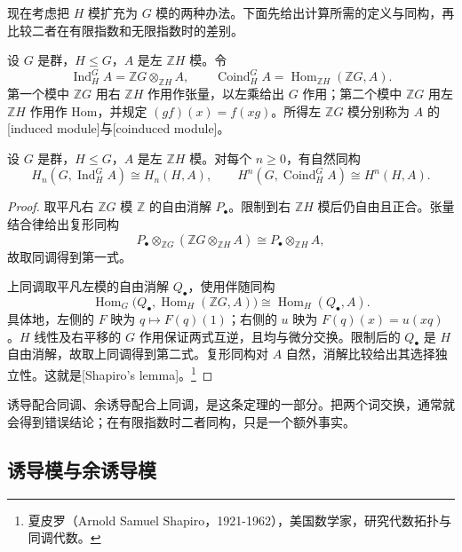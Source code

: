 \ProseParagraphBreak
现在考虑把 \(H\) 模扩充为 \(G\) 模的两种办法。下面先给出计算所需的定义与同构，再比较二者在有限指数和无限指数时的差别。

\begin{definition}\label{b4:def:group-induction}
设 \(G\) 是群，\(H\le G\)，\(A\) 是左 \(\mathbb ZH\) 模。令
\[
\operatorname{Ind}_H^G A=\mathbb ZG\otimes_{\mathbb ZH}A,\qquad
\operatorname{Coind}_H^G A=\operatorname{Hom}_{\mathbb ZH}(\mathbb ZG,A).
\]
第一个模中 \(\mathbb ZG\) 用右 \(\mathbb ZH\) 作用作张量，以左乘给出 \(G\) 作用；第二个模中 \(\mathbb ZG\) 用左 \(\mathbb ZH\) 作用作 Hom，并规定 \((g f)(x)=f(xg)\)。所得左 \(\mathbb ZG\) 模分别称为 \(A\) 的[induced module]与[coinduced module]。
\end{definition}

\begin{theorem}[Shapiro 引理]\label{b4:thm:shapiro}
设 \(G\) 是群，\(H\le G\)，\(A\) 是左 \(\mathbb ZH\) 模。对每个 \(n\ge0\)，有自然同构
\[
H_n(G,\operatorname{Ind}_H^G A)\cong H_n(H,A),\qquad
H^n(G,\operatorname{Coind}_H^G A)\cong H^n(H,A).
\]
\end{theorem}
\begin{proof}
取平凡右 \(\mathbb ZG\) 模 \(\mathbb Z\) 的自由消解 \(P_\bullet\)。限制到右 \(\mathbb ZH\) 模后仍自由且正合。张量结合律给出复形同构
\[
P_\bullet\otimes_{\mathbb ZG}
(\mathbb ZG\otimes_{\mathbb ZH}A)
\cong P_\bullet\otimes_{\mathbb ZH}A,
\]
故取同调得到第一式。

上同调取平凡左模的自由消解 \(Q_\bullet\)，使用伴随同构
\[
\operatorname{Hom}_G
\bigl(Q_\bullet,\operatorname{Hom}_H(\mathbb ZG,A)\bigr)
\cong\operatorname{Hom}_H(Q_\bullet,A).
\]
具体地，左侧的 \(F\) 映为 \(q\mapsto F(q)(1)\)；右侧的 \(u\) 映为
\(F(q)(x)=u(xq)\)。\(H\) 线性及右平移的 \(G\) 作用保证两式互逆，且均与微分交换。限制后的 \(Q_\bullet\) 是 \(H\) 自由消解，故取上同调得到第二式。复形同构对 \(A\) 自然，消解比较给出其选择独立性。这就是[Shapiro's lemma]。\footnote{夏皮罗（Arnold Samuel Shapiro，1921-1962），美国数学家，研究代数拓扑与同调代数。}
\end{proof}

诱导配合同调、余诱导配合上同调，是这条定理的一部分。把两个词交换，通常就会得到错误结论；在有限指数时二者同构，只是一个额外事实。

\subsection{诱导模与余诱导模}
\label{b4:subsec:1103:03}

